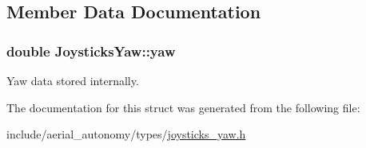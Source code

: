 \subsection{Member Data Documentation}
\hypertarget{structJoysticksYaw_aed456b5f37609c1b68843ccf1e29019a}{
\subsubsection[{yaw}]{\setlength{\rightskip}{0pt plus 5cm}double Joysticks\-Yaw\-::yaw}}\label{structJoysticksYaw_aed456b5f37609c1b68843ccf1e29019a}


Yaw data stored internally. 



The documentation for this struct was generated from the following file\-:\begin{DoxyCompactItemize}
\item 
include/aerial\-\_\-autonomy/types/\hyperlink{joysticks__yaw_8h}{joysticks\-\_\-yaw.\-h}\end{DoxyCompactItemize}
